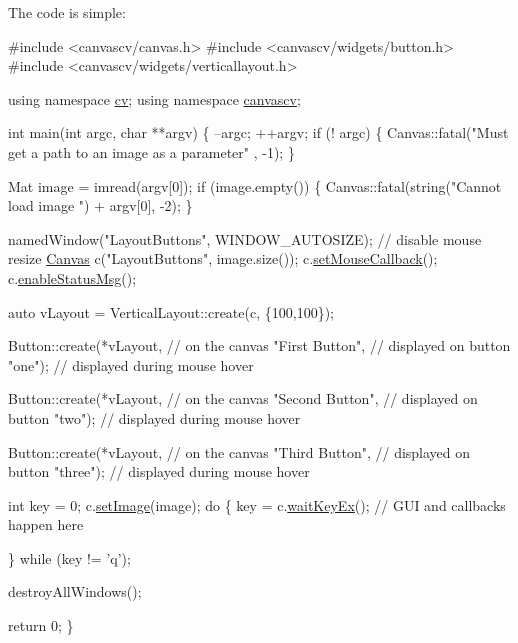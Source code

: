 The code is simple\+: 
\begin{DoxyCode}
\textcolor{preprocessor}{#include <canvascv/canvas.h>}
\textcolor{preprocessor}{#include <canvascv/widgets/button.h>}
\textcolor{preprocessor}{#include <canvascv/widgets/verticallayout.h>}

\textcolor{keyword}{using namespace }\hyperlink{namespacecv}{cv};
\textcolor{keyword}{using namespace }\hyperlink{namespacecanvascv}{canvascv};

\textcolor{keywordtype}{int} main(\textcolor{keywordtype}{int} argc, \textcolor{keywordtype}{char} **argv)
\{
    --argc;
    ++argv;
    \textcolor{keywordflow}{if} (! argc)
    \{
        Canvas::fatal(\textcolor{stringliteral}{"Must get a path to an image as a parameter"} , -1);
    \}

    Mat image = imread(argv[0]);
    \textcolor{keywordflow}{if} (image.empty())
    \{
        Canvas::fatal(\textcolor{keywordtype}{string}(\textcolor{stringliteral}{"Cannot load image "}) + argv[0], -2);
    \}

    namedWindow(\textcolor{stringliteral}{"LayoutButtons"}, WINDOW\_AUTOSIZE); \textcolor{comment}{// disable mouse resize}
    \hyperlink{classcanvascv_1_1Canvas}{Canvas} c(\textcolor{stringliteral}{"LayoutButtons"}, image.size());
    c.\hyperlink{classcanvascv_1_1Canvas_acf6e5d4b40aec610b0dc8c4f6bf93ac1}{setMouseCallback}();
    c.\hyperlink{classcanvascv_1_1Canvas_a402c43a42c0089c48a96e5303c1c1fe8}{enableStatusMsg}();

    \textcolor{keyword}{auto} vLayout = VerticalLayout::create(c, \{100,100\});

    Button::create(*vLayout,        \textcolor{comment}{// on the canvas}
                   \textcolor{stringliteral}{"First Button"},  \textcolor{comment}{// displayed on button}
                   \textcolor{stringliteral}{"one"});          \textcolor{comment}{// displayed during mouse hover}

    Button::create(*vLayout,        \textcolor{comment}{// on the canvas}
                   \textcolor{stringliteral}{"Second Button"}, \textcolor{comment}{// displayed on button}
                   \textcolor{stringliteral}{"two"});          \textcolor{comment}{// displayed during mouse hover}

    Button::create(*vLayout,        \textcolor{comment}{// on the canvas}
                   \textcolor{stringliteral}{"Third Button"},  \textcolor{comment}{// displayed on button}
                   \textcolor{stringliteral}{"three"});        \textcolor{comment}{// displayed during mouse hover}

    \textcolor{keywordtype}{int} key = 0;
    c.\hyperlink{classcanvascv_1_1Canvas_a441c5882c7ebebd454a306b3c3478ae7}{setImage}(image);
    \textcolor{keywordflow}{do}
    \{
        key = c.\hyperlink{classcanvascv_1_1Canvas_a59397db05f5d9e45264f626f6a2ae528}{waitKeyEx}(); \textcolor{comment}{// GUI and callbacks happen here}

    \} \textcolor{keywordflow}{while} (key != \textcolor{charliteral}{'q'});

    destroyAllWindows();

    \textcolor{keywordflow}{return} 0;
\}
\end{DoxyCode}
